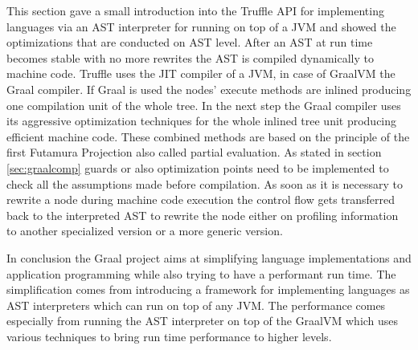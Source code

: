 This section gave a small introduction into the Truffle API for implementing languages via an AST interpreter for running on top of a JVM and showed the optimizations that are conducted on AST level. After an AST at run time becomes stable with no more rewrites the AST is compiled dynamically to machine code. Truffle uses the JIT compiler of a JVM, in case of GraalVM the Graal compiler. If Graal is used the nodes' execute methods are inlined producing one compilation unit of the whole tree. In the next step the Graal compiler uses its aggressive optimization techniques for the whole inlined tree unit producing efficient machine code. These combined methods are based on the principle of the first Futamura Projection also called partial evaluation. \cite{FutaPart} As stated in section \ref{sec:graalcomp} guards or also optimization points need to be implemented to check all the assumptions made before compilation. As soon as it is necessary to rewrite a node during machine code execution the control flow gets transferred back to the interpreted AST to rewrite the node either on profiling information to another specialized version or a more generic version. \cite{ChambDeopt}

In conclusion the Graal project aims at simplifying language implementations and application programming while also trying to have a performant run time. The simplification comes from introducing a framework for implementing languages as AST interpreters which can run on top of any JVM. The performance comes especially from running the AST interpreter on top of the GraalVM which uses various techniques to bring run time performance to higher levels.

